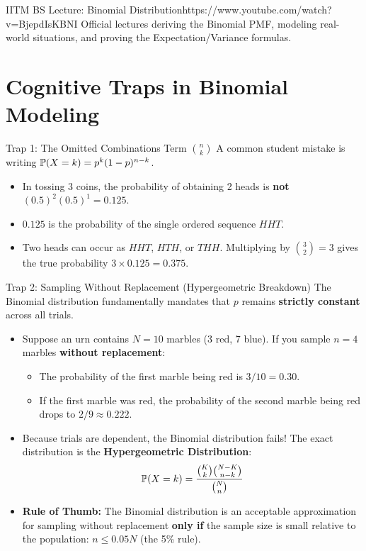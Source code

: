 \begin{videocard}{IITM BS Lecture: Binomial Distribution}{https://www.youtube.com/watch?v=BjepdIsKBNI}
Official lectures deriving the Binomial PMF, modeling real-world situations, and proving the Expectation/Variance formulas.
\end{videocard}

\section{Cognitive Traps in Binomial Modeling}

\begin{trapbox}{Trap 1: The Omitted Combinations Term $\binom{n}{k}$}
A common student mistake is writing $\P(X = k) = p^k (1-p)^{n-k}$.
\begin{itemize}
    \item In tossing 3 coins, the probability of obtaining 2 heads is \textbf{not} $(0.5)^2 (0.5)^1 = 0.125$.
    \item $0.125$ is the probability of the single ordered sequence $HHT$.
    \item Two heads can occur as $HHT$, $HTH$, or $THH$. Multiplying by $\binom{3}{2} = 3$ gives the true probability $3 \times 0.125 = \mathbf{0.375}$.
\end{itemize}
\end{trapbox}

\begin{trapbox}{Trap 2: Sampling Without Replacement (Hypergeometric Breakdown)}
The Binomial distribution fundamentally mandates that $p$ remains \textbf{strictly constant} across all trials.
\begin{itemize}
    \item Suppose an urn contains $N = 10$ marbles (3 red, 7 blue). If you sample $n = 4$ marbles \textbf{without replacement}:
    \begin{itemize}
        \item The probability of the first marble being red is $3/10 = 0.30$.
        \item If the first marble was red, the probability of the second marble being red drops to $2/9 \approx 0.222$.
    \end{itemize}
    \item Because trials are dependent, the Binomial distribution fails! The exact distribution is the \textbf{Hypergeometric Distribution}:
    $$\P(X = k) = \frac{\binom{K}{k}\binom{N - K}{n - k}}{\binom{N}{n}}$$
    \item \textbf{Rule of Thumb:} The Binomial distribution is an acceptable approximation for sampling without replacement \textbf{only if} the sample size is small relative to the population: $n \le 0.05 N$ (the 5\% rule).
\end{itemize}
\end{trapbox}

